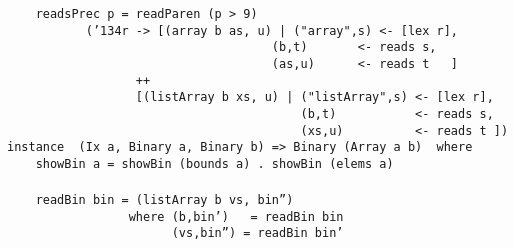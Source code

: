 \mbox{\tt \ \ \ \ readsPrec\ p\ =\ readParen\ (p\ >\ 9)}\\
\mbox{\tt \ \ \ \ \ \ \ \ \ \ \ ({\char'134}r\ ->\ [(array\ b\ as,\ u)\ |\ ("array",s)\ <-\ [lex\ r],}\\
\mbox{\tt \ \ \ \ \ \ \ \ \ \ \ \ \ \ \ \ \ \ \ \ \ \ \ \ \ \ \ \ \ \ \ \ \ \ \ \ \ (b,t)\ \ \ \ \ \ \ <-\ reads\ s,}\\
\mbox{\tt \ \ \ \ \ \ \ \ \ \ \ \ \ \ \ \ \ \ \ \ \ \ \ \ \ \ \ \ \ \ \ \ \ \ \ \ \ (as,u)\ \ \ \ \ \ <-\ reads\ t\ \ \ ]}\\
\mbox{\tt \ \ \ \ \ \ \ \ \ \ \ \ \ \ \ \ \ \ ++}\\
\mbox{\tt \ \ \ \ \ \ \ \ \ \ \ \ \ \ \ \ \ \ [(listArray\ b\ xs,\ u)\ |\ ("listArray",s)\ <-\ [lex\ r],}\\
\mbox{\tt \ \ \ \ \ \ \ \ \ \ \ \ \ \ \ \ \ \ \ \ \ \ \ \ \ \ \ \ \ \ \ \ \ \ \ \ \ \ \ \ \ (b,t)\ \ \ \ \ \ \ \ \ \ \ <-\ reads\ s,}\\
\mbox{\tt \ \ \ \ \ \ \ \ \ \ \ \ \ \ \ \ \ \ \ \ \ \ \ \ \ \ \ \ \ \ \ \ \ \ \ \ \ \ \ \ \ (xs,u)\ \ \ \ \ \ \ \ \ \ <-\ reads\ t\ ])}
%
\eprogB\noindent\bprogB
\mbox{\tt instance\ \ (Ix\ a,\ Binary\ a,\ Binary\ b)\ =>\ Binary\ (Array\ a\ b)\ \ where}\\
\mbox{\tt \ \ \ \ showBin\ a\ =\ showBin\ (bounds\ a)\ .\ showBin\ (elems\ a)}\\
\mbox{\tt }\\[-8pt]
\mbox{\tt \ \ \ \ readBin\ bin\ =\ (listArray\ b\ vs,\ bin'')}\\
\mbox{\tt \ \ \ \ \ \ \ \ \ \ \ \ \ \ \ \ \ where\ (b,bin')\ \ \ =\ readBin\ bin}\\
\mbox{\tt \ \ \ \ \ \ \ \ \ \ \ \ \ \ \ \ \ \ \ \ \ \ \ (vs,bin'')\ =\ readBin\ bin'}
%
\eprogB
